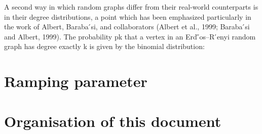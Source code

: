 \documentclass[12pt,beltcrest]{ociamthesis} %
\begin{document}
A second way in which random graphs differ from their real-world counterparts is in their degree distributions, a point which has been emphasized particularly in the work of Albert, Baraba ́si, and collaborators (Albert et al., 1999; Baraba ́si and Albert, 1999). The probability pk that a vertex in an Erd ̋os–R ́enyi random graph has degree exactly k is given by the binomial distribution:



\section{Ramping parameter} %
\label{sec:ramping_parameter}





\section{Organisation of this document} %
\label{sec:organisation_of_this_document}








\appendix



\end{document}
